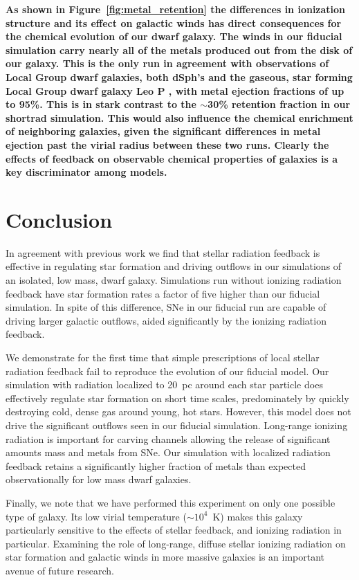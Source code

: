 \documentclass[twocolumn]{aastex62}
\begin{document}
\textbf{As shown in Figure~\ref{fig:metal_retention} the differences in ionization structure and its effect on galactic winds has direct consequences for the chemical evolution of our dwarf galaxy. The winds in our fiducial simulation carry nearly all of the metals produced out from the disk of our galaxy. This is the only run in agreement with observations of Local Group dwarf galaxies, both dSph's \citep{Kirby2011} and the gaseous, star forming Local Group dwarf galaxy Leo P \citep{McQuinn2015}, with metal ejection fractions of up to 95\%. This is in stark contrast to the $\sim$30\% retention fraction in our shortrad simulation. This would also influence the chemical enrichment of neighboring galaxies, given the significant differences in metal ejection past the virial radius between these two runs. Clearly the effects of feedback on observable chemical properties of galaxies is a key discriminator among models.}

\section{Conclusion}  \label{sec:conclusion}
In agreement with previous work we find that stellar radiation feedback is effective in regulating star formation and driving outflows in our simulations of an isolated, low mass, dwarf galaxy. Simulations run without ionizing radiation feedback have star formation rates a factor of five higher than our fiducial simulation. In spite of this difference, SNe in our fiducial run are capable of driving larger galactic outflows, aided significantly by the ionizing radiation feedback.

We demonstrate for the first time that simple prescriptions of local stellar radiation feedback fail to reproduce the evolution of our fiducial model. Our simulation with radiation localized to 20~pc around each star particle does effectively regulate star formation on short time scales, predominately by quickly destroying cold, dense gas around young, hot stars. However, this model does not drive the significant outflows seen in our fiducial simulation. Long-range ionizing radiation is important for carving channels allowing the release of significant amounts mass and metals from SNe. Our simulation with localized radiation feedback retains a significantly higher fraction of metals than expected observationally for low mass dwarf galaxies.  

Finally, we note that we have performed this experiment on only one possible type of galaxy. Its low virial temperature ($\sim10^{4}$~K) makes this galaxy particularly sensitive to the effects of stellar feedback, and ionizing radiation in particular. Examining the role of long-range, diffuse stellar ionizing radiation on star formation and galactic winds in more massive galaxies is an important avenue of future research. 
\end{document}
